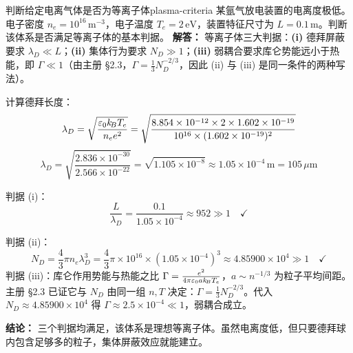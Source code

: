\begin{example}{判断给定电离气体是否为等离子体}{plasma-criteria}
某氩气放电装置的电离度极低。电子密度 $n_e = 10^{16}\,\mathrm{m}^{-3}$，电子温度 $T_e = 2\,\mathrm{eV}$，装置特征尺寸为 $L = 0.1\,\mathrm{m}$。判断该体系是否满足等离子体的基本判据。
\tcblower
\textbf{解答：}
等离子体三大判据：\textbf{(i)} 德拜屏蔽要求 $\lambda_D\ll L$；\textbf{(ii)} 集体行为要求 $N_D\gg 1$；\textbf{(iii)} 弱耦合要求库仑势能远小于热能，即 $\Gamma\ll 1$（由主册 §2.3，$\Gamma=\frac13N_D^{-2/3}$，因此 (ii) 与 (iii) 是同一条件的两种写法）。

计算德拜长度：
\[
\lambda_D = \sqrt{\frac{\varepsilon_0 k_{\!B}T_e}{n_e e^2}} = \sqrt{\frac{8.854\times 10^{-12}\times 2\times 1.602\times 10^{-19}}{10^{16}\times (1.602\times 10^{-19})^2}}
\]
\[
\lambda_D = \sqrt{\frac{2.836\times 10^{-30}}{2.566\times 10^{-22}}} = \sqrt{1.105\times 10^{-8}} \approx 1.05\times 10^{-4}\,\mathrm{m} = 105\,\mu\mathrm{m}
\]

判据 (i)：
\[
\frac{L}{\lambda_D} = \frac{0.1}{1.05\times 10^{-4}} \approx 952 \gg 1 \quad \checkmark
\]

判据 (ii)：
\[
N_D = \frac{4}{3}\pi n_e \lambda_D^3 = \frac{4}{3}\pi\times 10^{16}\times (1.05\times 10^{-4})^3 \approx 4.85900\times10^{4} \gg 1 \quad \checkmark
\]
判据 (iii)：库仑作用势能与热能之比 $\Gamma = \frac{e^2}{4\pi\varepsilon_0 a k_{\!B}T_e}$，$a\sim n^{-1/3}$ 为粒子平均间距。主册 §2.3 已证它与 $N_D$ 由同一组 $n,T$ 决定：$\Gamma=\frac13N_D^{-2/3}$。代入 $N_D\approx 4.85900\times10^{4}$ 得 $\Gamma\approx 2.5\times10^{-4}\ll 1$，弱耦合成立。

\textbf{结论：} 三个判据均满足，该体系是理想等离子体。虽然电离度低，但只要德拜球内包含足够多的粒子，集体屏蔽效应就能建立。
\end{example}


